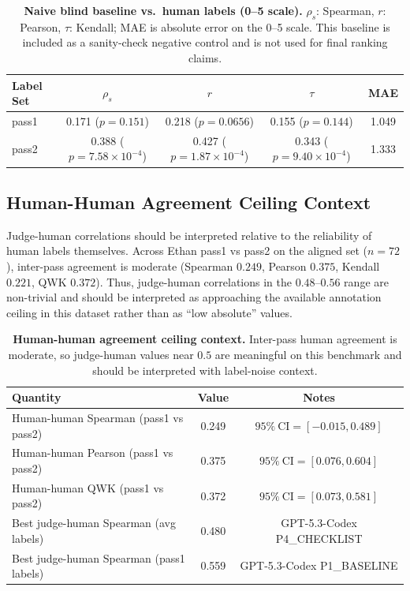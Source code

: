 \documentclass[numbers]{article}
\begin{document}
\begin{table}[t]
  \centering
  \small
  \begin{tabular}{lcccc}
    \toprule
    \textbf{Label Set} & \(\rho_s\)                      & \(r\)                           & \(\tau\)                        & \textbf{MAE} \\
    \midrule
    pass1              & 0.171 (\(p=0.151\))             & 0.218 (\(p=0.0656\))            & 0.155 (\(p=0.144\))             & 1.049        \\
    pass2              & 0.388 (\(p=7.58\times10^{-4}\)) & 0.427 (\(p=1.87\times10^{-4}\)) & 0.343 (\(p=9.40\times10^{-4}\)) & 1.333        \\
    \bottomrule
  \end{tabular}
  \caption{\textbf{Naive blind baseline vs.\ human labels (0--5 scale).}
    \(\rho_s\): Spearman, \(r\): Pearson, \(\tau\): Kendall; MAE is absolute error on the 0--5 scale.
    This baseline is included as a sanity-check negative control and is not used for final ranking claims.}
  \label{tab:app-naive-blind-baseline}
\end{table}

\subsection{Human-Human Agreement Ceiling Context}
Judge-human correlations should be interpreted relative to the reliability of human labels themselves.
Across Ethan pass1 vs pass2 on the aligned set (\(n=72\)), inter-pass agreement is moderate (Spearman \(0.249\), Pearson \(0.375\), Kendall \(0.221\), QWK \(0.372\)).
Thus, judge-human correlations in the \(0.48\)--\(0.56\) range are non-trivial and should be interpreted as approaching the available annotation ceiling in this dataset rather than as ``low absolute'' values.

\begin{table}[t]
  \centering
  \small
  \begin{tabular}{lcc}
    \toprule
    \textbf{Quantity}                        & \textbf{Value} & \textbf{Notes}                      \\
    \midrule
    Human-human Spearman (pass1 vs pass2)    & 0.249          & \(95\%\ \text{CI}=[-0.015, 0.489]\) \\
    Human-human Pearson (pass1 vs pass2)     & 0.375          & \(95\%\ \text{CI}=[0.076, 0.604]\)  \\
    Human-human QWK (pass1 vs pass2)         & 0.372          & \(95\%\ \text{CI}=[0.073, 0.581]\)  \\
    Best judge-human Spearman (avg labels)   & 0.480          & GPT-5.3-Codex P4\_CHECKLIST         \\
    Best judge-human Spearman (pass1 labels) & 0.559          & GPT-5.3-Codex P1\_BASELINE          \\
    \bottomrule
  \end{tabular}
  \caption{\textbf{Human-human agreement ceiling context.}
    Inter-pass human agreement is moderate, so judge-human values near \(0.5\) are meaningful on this benchmark and should be interpreted with label-noise context.}
  \label{tab:app-human-human-ceiling}
\end{table}
\end{document}
